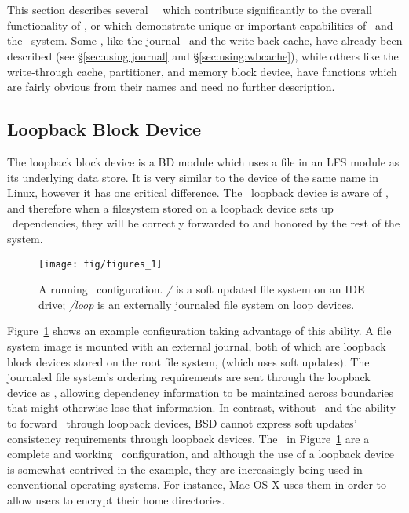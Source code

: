 \section{\Modules}
\label{sec:modules}

This section describes several \Kudos\ \modules\ which contribute significantly
to the overall functionality of \Kudos, or which demonstrate unique or
important capabilities of \chdescs\ and the \module\ system. Some \modules,
like the journal \module\ and the write-back cache, have already been described
(see \S\ref{sec:using:journal} and \S\ref{sec:using:wbcache}), while others
like the write-through cache, partitioner, and memory block device, have
functions which are fairly obvious from their names and need no further
description.





\subsection{Loopback Block Device}
\label{sec:modules:loop}

The loopback block device is a BD module which uses a file in an LFS module as
its underlying data store. It is very similar to the device of the same name in
Linux, however it has one critical difference. The \Kudos\ loopback device is
aware of \chdescs, and therefore when a filesystem stored on a loopback device
sets up \chdesc\ dependencies, they will be correctly forwarded to and honored
by the rest of the system.

\begin{figure}[htb]
  \centering
  \texttt{[image: fig/figures\_1]}
  \caption{A running \Kudos\ configuration. {\it/} is a soft updated
    file system on an IDE drive; {\it/loop} is an externally journaled
    file system on loop devices.}
  \label{fig:kfs-graph}
\end{figure}

Figure~\ref{fig:kfs-graph} shows an example configuration taking advantage of
this ability. A file system image is mounted with an external journal, both of
which are loopback block devices stored on the root file system, (which uses
soft updates). The journaled file system's ordering requirements are sent
through the loopback device as \chdescs, allowing dependency information to be
maintained across boundaries that might otherwise lose that information. In
contrast, without \chdescs\ and the ability to forward \chdescs\ through
loopback devices, BSD cannot express soft updates' consistency requirements
through loopback devices. The \modules\ in Figure~\ref{fig:kfs-graph} are a
complete and working \Kudos\ configuration, and although the use of a loopback
device is somewhat contrived in the example, they are increasingly being used in
conventional operating systems. For instance, Mac OS X uses them in order to
allow users to encrypt their home directories.

